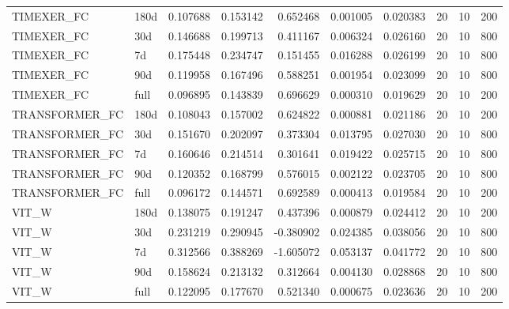 \begin{tabular}{llrrrrrrrr}
TIMEXER\_FC & 180d & 0.107688 & 0.153142 & 0.652468 & 0.001005 & 0.020383 & 20 & 10 & 200 \\
TIMEXER\_FC & 30d & 0.146688 & 0.199713 & 0.411167 & 0.006324 & 0.026160 & 20 & 10 & 800 \\
TIMEXER\_FC & 7d & 0.175448 & 0.234747 & 0.151455 & 0.016288 & 0.026199 & 20 & 10 & 800 \\
TIMEXER\_FC & 90d & 0.119958 & 0.167496 & 0.588251 & 0.001954 & 0.023099 & 20 & 10 & 800 \\
TIMEXER\_FC & full & 0.096895 & 0.143839 & 0.696629 & 0.000310 & 0.019629 & 20 & 10 & 200 \\
TRANSFORMER\_FC & 180d & 0.108043 & 0.157002 & 0.624822 & 0.000881 & 0.021186 & 20 & 10 & 200 \\
TRANSFORMER\_FC & 30d & 0.151670 & 0.202097 & 0.373304 & 0.013795 & 0.027030 & 20 & 10 & 800 \\
TRANSFORMER\_FC & 7d & 0.160646 & 0.214514 & 0.301641 & 0.019422 & 0.025715 & 20 & 10 & 800 \\
TRANSFORMER\_FC & 90d & 0.120352 & 0.168799 & 0.576015 & 0.002122 & 0.023705 & 20 & 10 & 800 \\
TRANSFORMER\_FC & full & 0.096172 & 0.144571 & 0.692589 & 0.000413 & 0.019584 & 20 & 10 & 200 \\
VIT\_W & 180d & 0.138075 & 0.191247 & 0.437396 & 0.000879 & 0.024412 & 20 & 10 & 200 \\
VIT\_W & 30d & 0.231219 & 0.290945 & -0.380902 & 0.024385 & 0.038056 & 20 & 10 & 800 \\
VIT\_W & 7d & 0.312566 & 0.388269 & -1.605072 & 0.053137 & 0.041772 & 20 & 10 & 800 \\
VIT\_W & 90d & 0.158624 & 0.213132 & 0.312664 & 0.004130 & 0.028868 & 20 & 10 & 800 \\
VIT\_W & full & 0.122095 & 0.177670 & 0.521340 & 0.000675 & 0.023636 & 20 & 10 & 200 \\
\bottomrule
\end{tabular}

